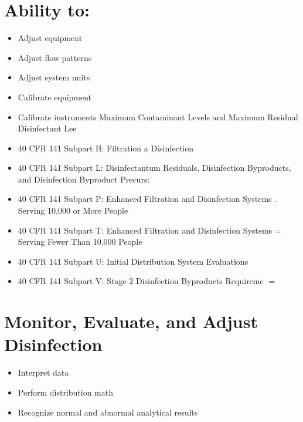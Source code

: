 \documentclass[10pt]{article}
\begin{document}
\section{Ability to:}
\begin{itemize}
  \item Adjust equipment

  \item Adjust flow patterns

  \item Adjust system units

  \item Calibrate equipment

  \item Calibrate instruments Maximum Contaminant Levels and Maximum Residual Disinfectant Lee

  \item 40 CFR 141 Subpart H: Filtration a Disinfection

  \item 40 CFR 141 Subpart L: Disinfectantum Residuals, Disinfection Byproducts, and Disinfection Byproduct Precurs:

  \item 40 CFR 141 Subpart P: Enhanced Filtration and Disinfection Systems . Serving 10,000 or More People

  \item 40 CFR 141 Subpart T: Enhanced Filtration and Disinfection Systems = Serving Fewer Than 10,000 People

  \item 40 CFR 141 Subpart U: Initial Distribution System Evaluations

  \item 40 CFR 141 Subpart V: Stage 2 Disinfection Byproducts Requireme $=$

\end{itemize}

\section{Monitor, Evaluate, and Adjust Disinfection}
\begin{itemize}
  \item Interpret data

  \item Perform distribution math

  \item Recognize normal and abnormal analytical results

\end{itemize}
\end{document}
